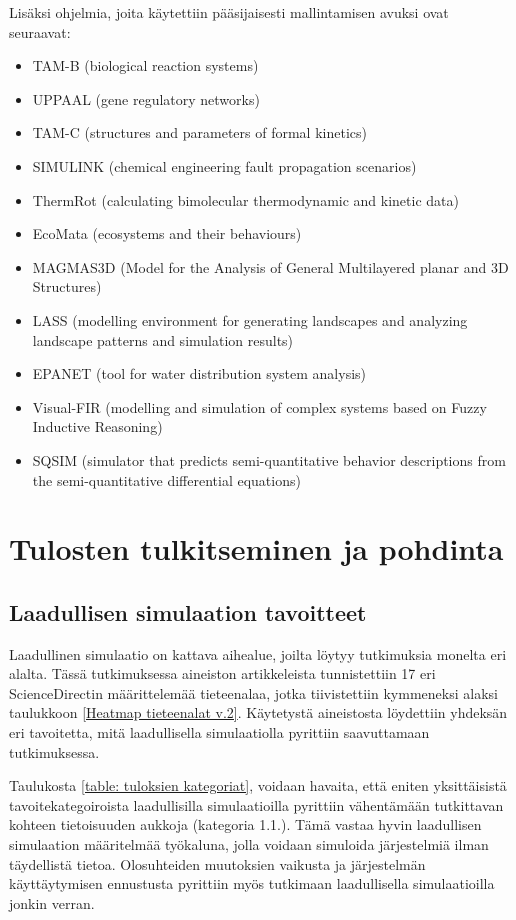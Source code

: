 \documentclass[utf8]{gradu3}
\begin{document}
Lisäksi ohjelmia, joita käytettiin pääsijaisesti mallintamisen avuksi ovat seuraavat:
\begin{itemize}
    \item TAM-B (biological reaction systems)
    \item UPPAAL (gene regulatory networks)
    \item TAM-C (structures and parameters of formal kinetics)
    \item SIMULINK (chemical engineering fault propagation scenarios)
    \item ThermRot (calculating bimolecular thermodynamic and kinetic data)
    \item EcoMata (ecosystems and their behaviours)
    \item MAGMAS3D (Model for the Analysis of General Multilayered planar and 3D Structures)
    \item LASS (modelling environment for generating landscapes and analyzing landscape patterns and simulation results)
    \item EPANET (tool for water distribution system analysis)
    \item Visual-FIR (modelling and simulation of complex systems based on Fuzzy Inductive Reasoning)
    \item SQSIM (simulator that predicts semi-quantitative behavior descriptions from the  semi-quantitative differential equations)
\end{itemize}

\chapter{Tulosten tulkitseminen ja pohdinta} \label{tulkitseminen ja pohdinta}

\section{Laadullisen simulaation tavoitteet}
Laadullinen simulaatio on kattava aihealue, joilta löytyy tutkimuksia monelta eri alalta.
Tässä tutkimuksessa aineiston artikkeleista tunnistettiin 17 
eri ScienceDirectin määrittelemää tieteenalaa, 
jotka tiivistettiin kymmeneksi alaksi taulukkoon 
\ref{Heatmap tieteenalat v.2}.
Käytetystä aineistosta löydettiin yhdeksän eri tavoitetta, 
mitä laadullisella simulaatiolla pyrittiin saavuttamaan tutkimuksessa.

Taulukosta \ref{table: tuloksien kategoriat}, voidaan havaita, 
että eniten yksittäisistä tavoitekategoiroista 
laadullisilla simulaatioilla pyrittiin vähentämään tutkittavan 
kohteen tietoisuuden aukkoja (kategoria 1.1.). 
Tämä vastaa hyvin laadullisen simulaation määritelmää
työkaluna, jolla voidaan simuloida järjestelmiä ilman täydellistä tietoa.
Olosuhteiden muutoksien vaikusta ja järjestelmän käyttäytymisen ennustusta
pyrittiin myös tutkimaan laadullisella simulaatioilla jonkin verran.
\end{document}
